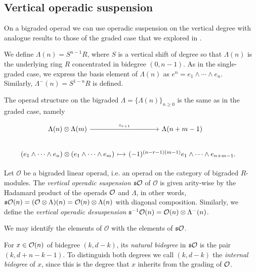 \documentclass[Thesis.tex]{subfiles}
\begin{document}

\subsection{Vertical operadic suspension}\label{vertical}
On a bigraded operad we can use operadic suspension on the vertical degree with analogue results to those of the graded case that we explored in .

We define $\Lambda(n)=S^{n-1}R$, where  $S$ is a vertical shift of degree so that $\Lambda(n)$ is the underlying ring $R$ concentrated in bidegree  $(0,n-1)$. As in the single-graded case, we express the basis element of $\Lambda(n)$ as $e^n=e_1\land\cdots\land e_n$. Similarly, $\Lambda^-(n)=S^{1-n}R$ is defined.

The operad structure on the bigraded $\Lambda=\{\Lambda(n)\}_{n\geq 0}$ is the same as in the graded case, namely

\[
\begin{tikzcd}[column sep = 1.2em]
\Lambda(n)\otimes\Lambda(m) \arrow[r, "\circ_{r+1}"] & \Lambda(n+m-1)\\
(e_1\land\cdots\land e_n)\otimes(e_1\land\cdots\land e_m)\arrow[r, mapsto] & (-1)^{(n-r-1)(m-1)}e_1\land\cdots\land e_{n+m-1}.
\end{tikzcd}
\]


\begin{defin}
Let $\mathcal{O}$ be a bigraded linear operad, i.e. an operad on the category of bigraded $R$-modules. The \emph{vertical operadic suspension} $\mathfrak{s}{\mathcal O}$ of $\mathcal{O}$ is given arity-wise by the Hadamard product of the operads ${\mathcal O}$ and $\Lambda$, in other words, $\mathfrak{s}{\mathcal O}(n)=(\mathcal{O}\otimes\Lambda)(n)=\mathcal{O}(n)\otimes\Lambda(n)$ with diagonal composition. Similarly, we define the \emph{vertical operadic desuspension} $\mathfrak{s}^{-1}{\mathcal O}(n)=\mathcal{O}(n)\otimes\Lambda^-(n)$.
\end{defin}


We may identify the elements of $\mathcal{O}$ with the elements of $\mathfrak{s}{\mathcal O}$. 
\begin{defin}
For $x\in{\mathcal O}(n)$ of bidegree $(k,d-k)$, its \emph{natural bidegree} in $\mathfrak{s}{\mathcal O}$ is the pair $(k,d+n-k-1)$. To distinguish both degrees we call $(k,d-k)$ the \emph{internal bidegree} of $x$, since this is the degree that $x$ inherits from the grading of ${\mathcal O}$. 
\end{defin}
\end{document}
